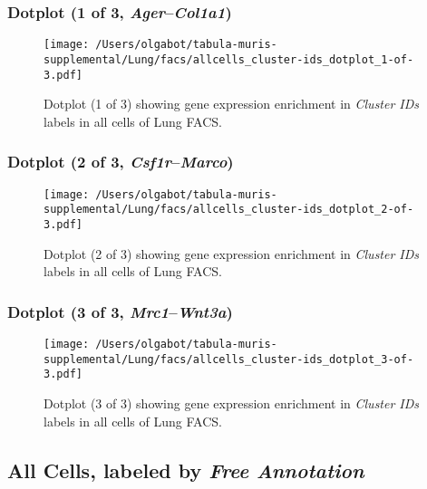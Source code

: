 \clearpage

\subsubsection{Dotplot (1 of 3, \emph{Ager}--\emph{Col1a1})}
\begin{figure}[h]
\centering
\texttt{[image: /Users/olgabot/tabula-muris-supplemental/Lung/facs/allcells\_cluster-ids\_dotplot\_1-of-3.pdf]}

\caption{ Dotplot (1 of 3)  showing gene expression enrichment in \emph{Cluster IDs} labels in all cells of Lung FACS. }
\end{figure}


\clearpage

\subsubsection{Dotplot (2 of 3, \emph{Csf1r}--\emph{Marco})}
\begin{figure}[h]
\centering
\texttt{[image: /Users/olgabot/tabula-muris-supplemental/Lung/facs/allcells\_cluster-ids\_dotplot\_2-of-3.pdf]}

\caption{ Dotplot (2 of 3)  showing gene expression enrichment in \emph{Cluster IDs} labels in all cells of Lung FACS. }
\end{figure}


\clearpage

\subsubsection{Dotplot (3 of 3, \emph{Mrc1}--\emph{Wnt3a})}
\begin{figure}[h]
\centering
\texttt{[image: /Users/olgabot/tabula-muris-supplemental/Lung/facs/allcells\_cluster-ids\_dotplot\_3-of-3.pdf]}

\caption{ Dotplot (3 of 3)  showing gene expression enrichment in \emph{Cluster IDs} labels in all cells of Lung FACS. }
\end{figure}


\clearpage

\subsection{All Cells, labeled by \emph{Free Annotation}}
